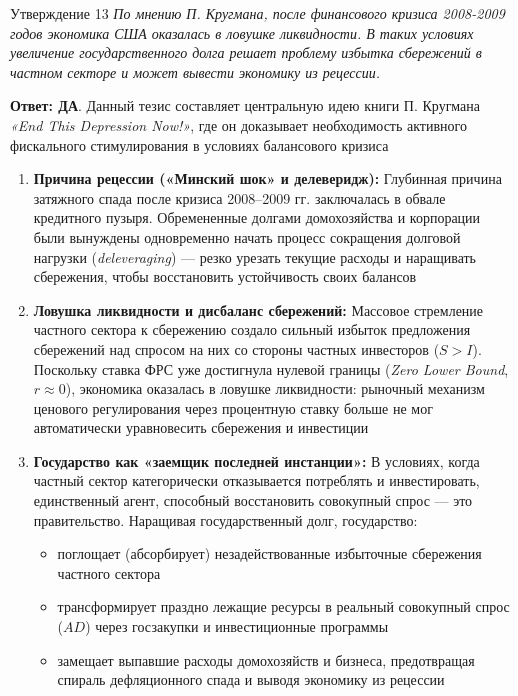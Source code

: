 \documentclass[10pt,a4paper]{article}
\newcommand{\qda}{\textbf{\color{yesgreen}Ответ: ДА}}
\newenvironment{answer}[2]{%
  \begin{qbox}{Утверждение #1}
  \textit{#2}\par\smallskip
}{%
  \end{qbox}\vspace{2pt}
}
\begin{document}
\begin{answer}{13}{По мнению П. Кругмана, после финансового кризиса 2008-2009 годов экономика США оказалась в ловушке ликвидности. В таких условиях увеличение государственного долга решает проблему избытка сбережений в частном секторе и может вывести экономику из рецессии.}
\qda. Данный тезис составляет центральную идею книги П. Кругмана \textit{«End This Depression Now!»}, где он доказывает необходимость активного фискального стимулирования в условиях балансового кризиса

\begin{enumerate}
    \item \textbf{Причина рецессии («Минский шок» и делеверидж):}
    Глубинная причина затяжного спада после кризиса 2008–2009 гг. заключалась в обвале кредитного пузыря. Обремененные долгами домохозяйства и корпорации были вынуждены одновременно начать процесс сокращения долговой нагрузки (\textit{deleveraging}) — резко урезать текущие расходы и наращивать сбережения, чтобы восстановить устойчивость своих балансов

    \item \textbf{Ловушка ликвидности и дисбаланс сбережений:}
    Массовое стремление частного сектора к сбережению создало сильный избыток предложения сбережений над спросом на них со стороны частных инвесторов ($S > I$). Поскольку ставка ФРС уже достигнула нулевой границы (\textit{Zero Lower Bound}, $r \approx 0$), экономика оказалась в ловушке ликвидности: рыночный механизм ценового регулирования через процентную ставку больше не мог автоматически уравновесить сбережения и инвестиции

    \item \textbf{Государство как «заемщик последней инстанции»:}
    В условиях, когда частный сектор категорически отказывается потреблять и инвестировать, единственный агент, способный восстановить совокупный спрос — это правительство. Наращивая государственный долг, государство:
    \begin{itemize}
        \item поглощает (абсорбирует) незадействованные избыточные сбережения частного сектора
        \item трансформирует праздно лежащие ресурсы в реальный совокупный спрос ($AD$) через госзакупки и инвестиционные программы
        \item замещает выпавшие расходы домохозяйств и бизнеса, предотвращая спираль дефляционного спада и выводя экономику из рецессии
    \end{itemize}
\end{enumerate}
\end{answer}
\end{document}
